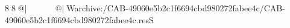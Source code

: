 8  8  @|                                                  @| W   archive:/CAB-49060e5b2c1f6694cbd980272fabee4c/CAB-49060e5b2c1f6694cbd980272fabee4c.resS 